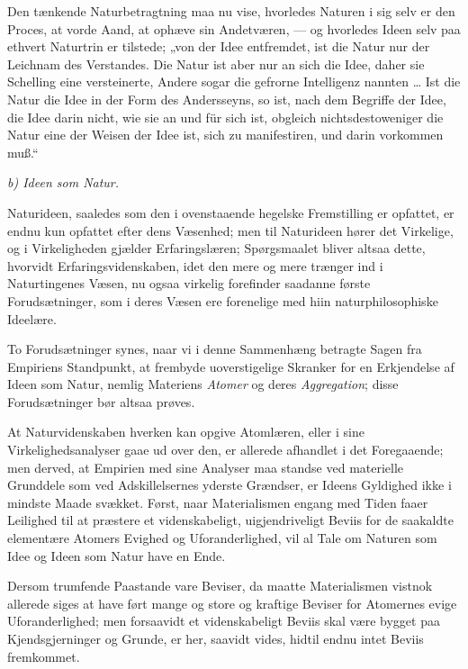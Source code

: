 \documentclass[12pt]{book}
\newcommand{\opage}[1]{\marginnote{\footnotesize\textit{[#1]}}}
\begin{document}
Den tænkende Naturbetragtning maa nu vise, hvorledes Naturen i sig selv er den Proces, at vorde Aand,
at ophæve sin Andetværen, --- og hvorledes Ideen selv paa ethvert Naturtrin er tilstede; „von der
Idee entfremdet, ist die Natur nur der Leichnam des Verstandes. Die Natur ist aber nur an sich die
Idee, daher sie Schelling eine versteinerte, Andere sogar die gefrorne Intelligenz nannten \ldots{}
Ist die Natur die Idee in der Form des Andersseyns, so ist, nach dem Begriffe der Idee, die Idee darin
nicht, wie sie an und für sich ist, obgleich nichtsdestoweniger die Natur eine der Weisen der Idee
ist, sich zu manifestiren, und darin vorkommen muß.“

\begin{center}\emph{b) Ideen som Natur.}\end{center}

Naturideen, saaledes som den i ovenstaaende hegelske Fremstilling er opfattet, er endnu kun opfattet
efter dens
\opage{194} Væsenhed; men til Naturideen hører det Virkelige, og i Virkeligheden gjælder Erfaringslæren;
Spørgsmaalet bliver altsaa dette, hvorvidt Erfaringsvidenskaben, idet den mere og mere trænger ind i
Naturtingenes Væsen, nu ogsaa virkelig forefinder saadanne første Forudsætninger, som i deres Væsen
ere forenelige med hiin naturphilosophiske Ideelære.

To Forudsætninger synes, naar vi i denne Sammenhæng betragte Sagen fra Empiriens Standpunkt, at
frembyde uoverstigelige Skranker for en Erkjendelse af Ideen som Natur, nemlig Materiens \emph{Atomer}
og deres \emph{Aggregation}; disse Forudsætninger bør altsaa prøves.

At Naturvidenskaben hverken kan opgive Atomlæren, eller i sine Virkelighedsanalyser gaae ud over den,
er allerede afhandlet i det Foregaaende; men derved, at Empirien med sine Analyser maa standse ved
materielle Grunddele som ved Adskillelsernes yderste Grændser, er Ideens Gyldighed ikke i mindste
Maade svækket. Først, naar Materialismen engang med Tiden faaer Leilighed til at præstere et
videnskabeligt, uigjendriveligt Beviis for de saakaldte elementære Atomers Evighed og
Uforanderlighed, vil al Tale om Naturen som Idee og Ideen som Natur have en Ende.

Dersom trumfende Paastande vare Beviser, da maatte Materialismen vistnok allerede siges at have ført
mange og store og kraftige Beviser for Atomernes evige Uforanderlighed; men forsaavidt et
videnskabeligt Beviis skal være bygget paa Kjendsgjerninger og Grunde, er her, saavidt vides, hidtil
endnu intet Beviis fremkommet.
\end{document}
